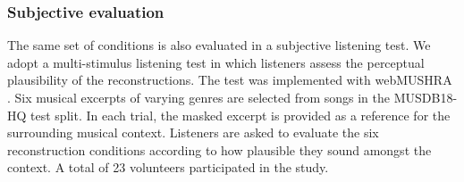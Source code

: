 \documentclass{article}
\begin{document}




\vspace{-5pt}
\subsubsection{Subjective evaluation} \label{sec:subjective_latent}
\vspace{-3pt}



The same set of conditions is also evaluated in a subjective listening test.
We adopt a multi-stimulus listening test in which listeners assess the perceptual plausibility of the reconstructions.
The test was implemented with webMUSHRA \cite{schoeffler2018webmushra}.
Six musical excerpts of varying genres are selected from songs in the MUSDB18-HQ \cite{musdb18-hq} test split. %
In each trial, the masked excerpt is provided as a reference for the surrounding musical context. Listeners are asked to evaluate the six reconstruction conditions according to how plausible they sound amongst the context.
A total of 23 volunteers participated in the study.

    
\end{document}
